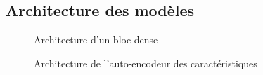 \subsection{Architecture des modèles}

    \begin{figure}[H]
        \centering
        \caption{Architecture d'un bloc dense}
        \label{fig:architecture_bloc_dense}
    \end{figure}

    
    \begin{figure}[H]
        \centering
        \caption{Architecture de l'auto-encodeur des caractéristiques}
        \label{fig:architecture_autoencoder_caracteristique}
    \end{figure}

    